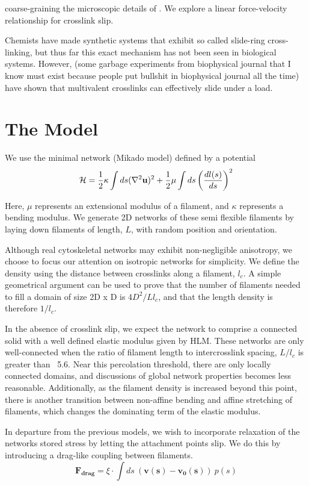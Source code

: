 \documentclass[prb,11pt]{revtex4-1}
\begin{document}
coarse-graining the microscopic details of .  We explore a linear force-velocity relationship for crosslink slip. 

Chemists have made synthetic systems that exhibit so called slide-ring cross-linking, but thus far this exact mechanism has not been seen in biological systems.  However, (some garbage experiments from biophysical journal that I know must exist because people put bullshit in biophysical journal all the time) have shown that multivalent crosslinks can effectively slide under a load.


\section{The Model}

We use the minimal network (Mikado model) defined by a potential
\begin{equation}
{\cal H} =\frac{1}{2}\kappa \int ds(\nabla^2\mathbf{u})^2 + \frac{1}{2}\mu \int ds \left ( \frac{dl(s) }{ds} \right )^2
\end{equation}

Here, $\mu$ represents an extensional modulus of a filament, and $\kappa$ represents a bending modulus.  We generate 2D networks of these semi flexible filaments by laying down filaments of length, $L$, with random position and orientation.  

Although real cytoskeletal networks may exhibit non-negligible anisotropy, we choose to focus our attention on isotropic networks for simplicity.  We define the density using the distance between crosslinks along a filament, $l_c$. A simple geometrical argument can be used to prove that the number of filaments needed to fill a domain of size 2D x D is $4D^2/Ll_c$, and that the length density is therefore $1/l_c$. 

In the absence of crosslink slip, we expect the network to comprise a connected solid with a well defined elastic modulus given by HLM.  These networks are only well-connected when the ratio of filament length to intercrosslink spacing, $L/l_c$ is greater than ~5.6.  Near this percolation threshold, there are only locally connected domains, and discussions of global network properties becomes less reasonable.  Additionally, as the filament density is increased beyond this point, there is another transition between non-affine bending and affine stretching of filaments, which changes the dominating term of the elastic modulus.

In departure from the previous models, we wish to incorporate relaxation of the networks stored stress by letting the attachment points slip.  We do this by introducing a drag-like coupling between filaments.
\begin{equation}
\mathbf{F_{drag}} = \xi \cdot \int ds \: (\mathbf{v(s)}-\mathbf{v_0(s)}) \: p(s)
\end{equation}
\end{document}
